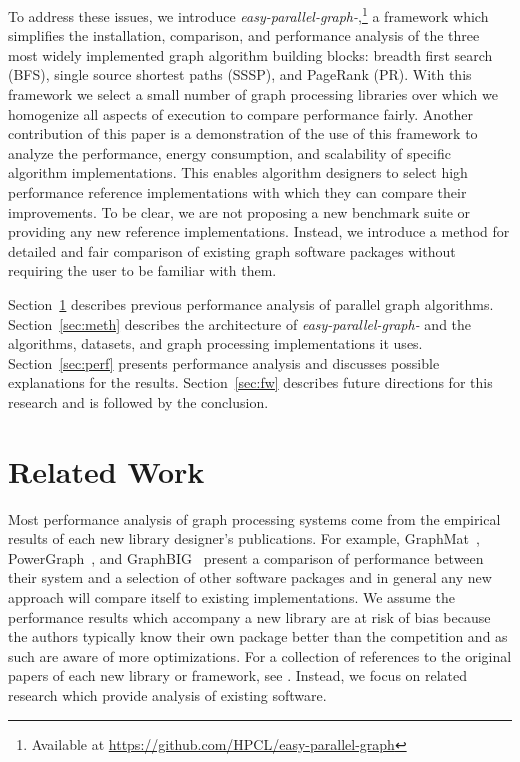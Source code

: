 \documentclass[conference]{IEEEtran}
\begin{document}
To address these issues, we introduce \emph{easy-parallel-\mbox{graph-\textasteriskcentered}},\footnote{Available at \url{https://github.com/HPCL/easy-parallel-graph}} a framework which simplifies the installation, comparison, and performance analysis of the three most widely implemented graph algorithm building blocks: breadth first search (BFS), single source shortest paths (SSSP), and PageRank (PR). With this framework we select a small number of graph processing libraries over which we homogenize all aspects of execution to compare performance fairly. Another contribution of this paper is a demonstration of the use of this framework to analyze the performance, energy consumption, and scalability of specific algorithm implementations. This enables algorithm designers to select high performance reference implementations with which they can compare their improvements. To be clear, we are not proposing a new benchmark suite or providing any new reference implementations. Instead, we introduce a method for detailed and fair comparison of existing graph software packages without requiring the user to be familiar with them.

Section~\ref{sec:relatedwork} describes previous performance analysis of parallel graph algorithms. Section~\ref{sec:meth} describes the architecture of \emph{easy-parallel-\mbox{graph-\textasteriskcentered}} and the algorithms, datasets, and graph processing implementations it uses. Section~\ref{sec:perf} presents performance analysis and discusses possible explanations for the results. Section~\ref{sec:fw} describes future directions for this research and is followed by the conclusion.

\section{Related Work}\label{sec:relatedwork}
Most performance analysis of graph processing systems come from the empirical results of each new library designer's publications. For example, GraphMat~\cite{Sundaram:2015:GraphMat}, PowerGraph~\cite{Gonzalez:2012:Powergraph}, and GraphBIG~\cite{Nai:2015:Graphbig} present a comparison of performance between their system and a selection of other software packages and in general any new approach will compare itself to existing implementations. We assume the performance results which accompany a new library are at risk of bias because the authors typically know their own package better than the competition and as such are aware of more optimizations. For a collection of references to the original papers of each new library or framework, see \cite{Doekemeijer:2015:GPFSurvey}. Instead, we focus on related research which provide analysis of existing software.
\end{document}
